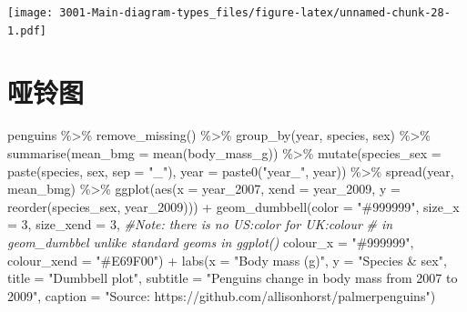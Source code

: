 \documentclass[
]{book}
\newenvironment{Shaded}{\begin{snugshade}}{\end{snugshade}}
\newcommand{\AttributeTok}[1]{\textcolor[rgb]{0.77,0.63,0.00}{#1}}
\newcommand{\CommentTok}[1]{\textcolor[rgb]{0.56,0.35,0.01}{\textit{#1}}}
\newcommand{\DecValTok}[1]{\textcolor[rgb]{0.00,0.00,0.81}{#1}}
\newcommand{\FunctionTok}[1]{\textcolor[rgb]{0.00,0.00,0.00}{#1}}
\newcommand{\NormalTok}[1]{#1}
\newcommand{\SpecialCharTok}[1]{\textcolor[rgb]{0.00,0.00,0.00}{#1}}
\newcommand{\StringTok}[1]{\textcolor[rgb]{0.31,0.60,0.02}{#1}}
\begin{document}
\texttt{[image: 3001-Main-diagram-types\_files/figure-latex/unnamed-chunk-28-1.pdf]}

\hypertarget{ux54d1ux94c3ux56fe}{%
\section{哑铃图}\label{ux54d1ux94c3ux56fe}}

\begin{Shaded}
\begin{Highlighting}[]
\NormalTok{penguins }\SpecialCharTok{\%\textgreater{}\%}
    \FunctionTok{remove\_missing}\NormalTok{() }\SpecialCharTok{\%\textgreater{}\%}
    \FunctionTok{group\_by}\NormalTok{(year, species, sex) }\SpecialCharTok{\%\textgreater{}\%}
    \FunctionTok{summarise}\NormalTok{(}\AttributeTok{mean\_bmg =} \FunctionTok{mean}\NormalTok{(body\_mass\_g)) }\SpecialCharTok{\%\textgreater{}\%}
    \FunctionTok{mutate}\NormalTok{(}\AttributeTok{species\_sex =} \FunctionTok{paste}\NormalTok{(species, sex, }\AttributeTok{sep =} \StringTok{"\_"}\NormalTok{),}
         \AttributeTok{year =} \FunctionTok{paste0}\NormalTok{(}\StringTok{"year\_"}\NormalTok{, year)) }\SpecialCharTok{\%\textgreater{}\%}
    \FunctionTok{spread}\NormalTok{(year, mean\_bmg) }\SpecialCharTok{\%\textgreater{}\%}
    \FunctionTok{ggplot}\NormalTok{(}\FunctionTok{aes}\NormalTok{(}\AttributeTok{x =}\NormalTok{ year\_2007, }\AttributeTok{xend =}\NormalTok{ year\_2009, }
               \AttributeTok{y =} \FunctionTok{reorder}\NormalTok{(species\_sex, year\_2009))) }\SpecialCharTok{+}
    \FunctionTok{geom\_dumbbell}\NormalTok{(}\AttributeTok{color =} \StringTok{"\#999999"}\NormalTok{, }
                      \AttributeTok{size\_x =} \DecValTok{3}\NormalTok{, }
                      \AttributeTok{size\_xend =} \DecValTok{3}\NormalTok{,}
                      \CommentTok{\#Note: there is no US:\textquotesingle{}color\textquotesingle{} for UK:\textquotesingle{}colour\textquotesingle{} }
                      \CommentTok{\# in geom\_dumbbel unlike standard geoms in ggplot()}
                      \AttributeTok{colour\_x =} \StringTok{"\#999999"}\NormalTok{,}
                      \AttributeTok{colour\_xend =} \StringTok{"\#E69F00"}\NormalTok{) }\SpecialCharTok{+}
      \FunctionTok{labs}\NormalTok{(}\AttributeTok{x =} \StringTok{"Body mass (g)"}\NormalTok{, }
           \AttributeTok{y =} \StringTok{"Species \& sex"}\NormalTok{,}
          \AttributeTok{title =} \StringTok{"Dumbbell plot"}\NormalTok{, }
          \AttributeTok{subtitle =} \StringTok{"Penguin\textquotesingle{}s change in body mass from 2007 to 2009"}\NormalTok{,}
          \AttributeTok{caption =} \StringTok{"Source: https://github.com/allisonhorst/palmerpenguins"}\NormalTok{)}
\end{Highlighting}
\end{Shaded}
\end{document}
